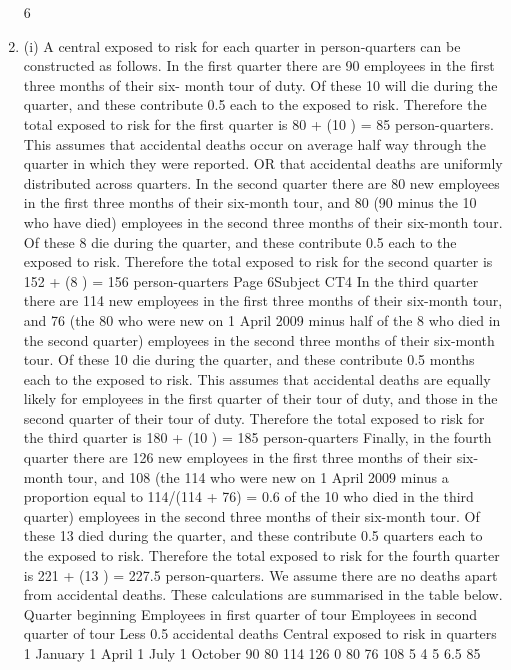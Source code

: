 \documentclass[a4paper,12pt]{article}
\begin{document}
\begin{enumerate}
6
\item (i)
A central exposed to risk for each quarter in person-quarters can be
constructed as follows.
In the first quarter there are 90 employees in the first three months of their six-
month tour of duty. Of these 10 will die during the quarter, and these
contribute 0.5 each to the exposed to risk.
Therefore the total exposed to risk for the first quarter is
80 + (10 ) = 85 person-quarters.
This assumes that accidental deaths occur on average half way
through the quarter in which they were reported. OR that accidental
deaths are uniformly distributed across quarters.
In the second quarter there are 80 new employees in the first three months of
their six-month tour, and 80 (90 minus the 10 who have died) employees in
the second three months of their six-month tour. Of these 8 die during the
quarter, and these contribute 0.5 each to the exposed to risk.
Therefore the total exposed to risk for the second quarter
is 152 + (8 ) = 156 person-quarters
Page 6Subject CT4 %
In the third quarter there are 114 new employees in the first three months of
their six-month tour, and 76 (the 80 who were new on 1 April 2009 minus half
of the 8 who died in the second quarter) employees in the second three
months of their six-month tour. Of these 10 die during the quarter, and these
contribute 0.5 months each to the exposed to risk.
This assumes that accidental deaths are equally likely for employees
in the first quarter of their tour of duty, and those in the second quarter
of their tour of duty.
Therefore the total exposed to risk for the third quarter
is 180 + (10 ) = 185 person-quarters
Finally, in the fourth quarter there are 126 new employees in the first three
months of their six-month tour, and 108 (the 114 who were new on 1 April
2009 minus a proportion equal to 114/(114 + 76) = 0.6 of the 10 who died in
the third quarter) employees in the second three months of their six-month
tour.
Of these 13 died during the quarter, and these contribute
0.5 quarters each to the exposed to risk.
Therefore the total exposed to risk for the fourth quarter is
221 + (13 ) = 227.5 person-quarters.
We assume there are no deaths apart from accidental deaths.
These calculations are summarised in the table below.
Quarter
beginning Employees in
first quarter
of tour Employees in
second quarter
of tour Less 0.5 \times
accidental
deaths Central
exposed
to risk in
quarters
1 January
1 April
1 July
1 October 90
80
114
126 0
80
76
108 5
4
5
6.5 85

\end{enumerate}
\end{document}
